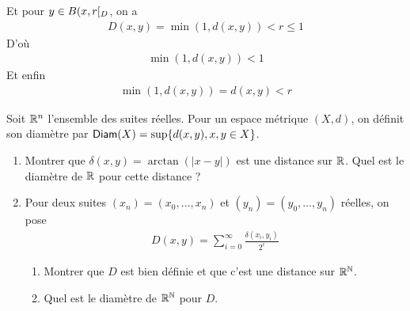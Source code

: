 \documentclass[french,a4paper,10pt]{article}
\begin{document}
\begin{td-sol}
\begin{enumerate}
				Et pour $y\in B({x,r}\mathopen{}[\mathclose{}_D$, on a
					\[\begin{gathered}
						D(x,y)=\min(1,d(x,y))<r\le 1
					\end{gathered}\]
				D'où
					\[\begin{aligned}
						\min(1,d(x,y))<1
					\end{aligned}\]
				Et enfin
					\[\begin{aligned}
						\min(1,d(x,y))=d(x,y)<r
					\end{aligned}\]
		\end{enumerate}
	\end{td-sol}
	\begin{td-exo}
		Soit $\mathbb{R}^n$ l'ensemble des suites réelles. Pour un espace métrique $(X,d)$, on définit son diamètre par $\operatorname{\mathsf{Diam}}(X)=\sup\{d(x,y),x,y\in X\}$.
			\begin{enumerate}
				\item Montrer que $\delta (x,y)=\arctan(|x-y|)$ est une distance sur $\mathbb{R}$. Quel est le diamètre de $\mathbb{R}$ pour cette distance ?
				
				\item Pour deux suites $(x_n)=(x_0,\dots,x_n)$ et $(y_n)=(y_0,\dots,y_n)$ réelles, on pose
					\[\begin{aligned}
						D(x,y)=\sum_{i=0}^\infty \frac{\delta(x_i,y_i)}{2^i}
					\end{aligned}\]
						\begin{enumerate}
							\item Montrer que $D$ est bien définie et que c'est une distance sur $\mathbb{R}^{\mathbb{N}}$.
							\item Quel est le diamètre de $\mathbb{R}^{\mathbb{N}}$ pour $D$.
						\end{enumerate}
			\end{enumerate}
	\end{td-exo}
\end{document}
